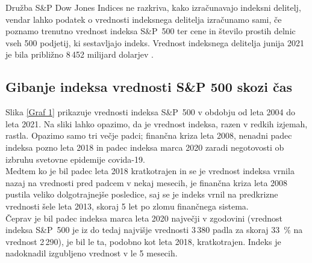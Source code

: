 \documentclass[12pt,a4paper, reqno]{amsart}
\theoremstyle{definition} %
\theoremstyle{plain} %
\begin{document}
Družba S\&P Dow Jones Indices ne razkriva, kako izračunavajo indeksni delitelj, vendar lahko podatek o vrednosti indeksnega delitelja izračunamo sami, če poznamo trenutno vrednost indeksa  S\&P~500 ter cene in število prostih delnic vseh 500 podjetij, ki sestavljajo indeks. Vrednost indeksnega delitelja junija 2021 je bila približno 8\,452 milijard dolarjev \cite{spx_devisor}.\\
\newpage
\subsection{Gibanje indeksa vrednosti S\&P 500 skozi čas}
Slika \ref{Graf 1} prikazuje vrednosti indeksa S\&P~500 v obdobju od leta 2004 do leta 2021. Na sliki lahko opazimo, da je vrednost indeksa, razen v redkih izjemah, rastla.
Opazimo samo tri večje padci; finančna kriza leta 2008, nenadni padec indeksa pozno leta 2018 in padec indeksa marca 2020 zaradi negotovosti ob izbruhu svetovne epidemije covida-19. \\

Medtem ko je bil padec leta 2018 kratkotrajen in se je vrednost indeksa vrnila nazaj na vrednosti pred padcem v nekaj mesecih, je finančna kriza leta 2008 pustila veliko dolgotrajnejše posledice, saj se je indeks vrnil na predkrizne vrednosti šele leta 2013, skoraj 5 let po zlomu finančnega sistema. \\

Čeprav je bil padec indeksa marca leta 2020 največji v zgodovini (vrednost indeksa S\&P~500 je iz do tedaj najvišje vrednosti 3\,380 padla za skoraj 33~\% na vrednost 2\,290), je bil le ta, podobno kot leta 2018, kratkotrajen. Indeks je nadoknadil izgubljeno vrednost v le 5 mesecih.  \\
\end{document}
